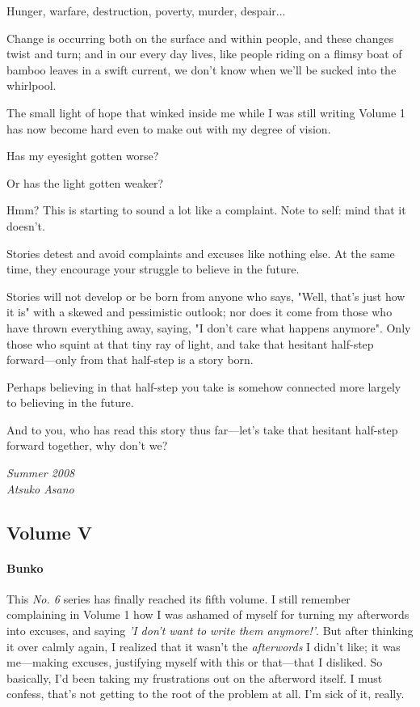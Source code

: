 Hunger, warfare, destruction, poverty, murder, despair...

Change is occurring both on the surface and within people, and these
changes twist and turn; and in our every day lives, like people riding
on a flimsy boat of bamboo leaves in a swift current, we don't know when
we'll be sucked into the whirlpool.

The small light of hope that winked inside me while I was still writing
Volume 1 has now become hard even to make out with my degree of vision.

Has my eyesight gotten worse?

Or has the light gotten weaker?

Hmm? This is starting to sound a lot like a complaint. Note to self:
mind that it doesn't.

Stories detest and avoid complaints and excuses like nothing else. At
the same time, they encourage your struggle to believe in the future.

Stories will not develop or be born from anyone who says, "Well, that's
just how it is" with a skewed and pessimistic outlook; nor does it come
from those who have thrown everything away, saying, "I don't care what
happens anymore". Only those who squint at that tiny ray of light, and
take that hesitant half-step forward---only from that half-step is a story
born.

Perhaps believing in that half-step you take is somehow connected more
largely to believing in the future.

And to you, who has read this story thus far---let's take that hesitant
half-step forward together, why don't we?

\myspace

\emph{Summer 2008\\
	Atsuko Asano}

\subsection{Volume V}
\paragraph{Bunko}

This \emph{No. 6} series has finally reached its fifth volume. I still remember
complaining in Volume 1 how I was ashamed of myself for turning my
afterwords into excuses, and saying \emph{'I don't want to write them
anymore!'}. But after thinking it over calmly again, I realized that it
wasn't the \emph{afterwords} I didn't like; it was me---making excuses,
justifying myself with this or that---that I disliked. So basically, I'd
been taking my frustrations out on the afterword itself. I must confess,
that's not getting to the root of the problem at all. I'm sick of it,
really.

